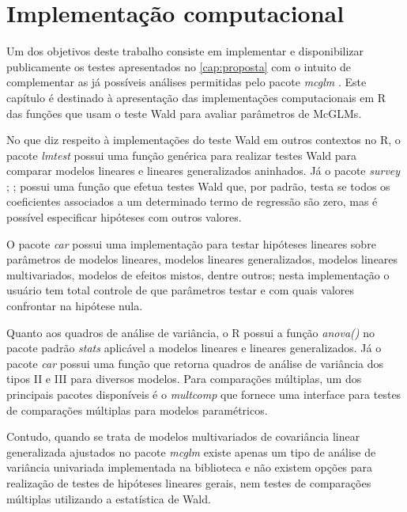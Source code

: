 
\chapter{Implementação computacional}\label{cap:implementacao}


Um dos objetivos deste trabalho consiste em implementar e disponibilizar publicamente os testes apresentados no \autoref{cap:proposta} com o intuito de complementar as já possíveis análises permitidas pelo pacote \emph{mcglm} \citep{mcglm}. Este capítulo é destinado à apresentação das implementações computacionais em R das funções que usam o teste Wald para avaliar parâmetros de McGLMs.

No que diz respeito à implementações do teste Wald em outros contextos no R, o pacote \emph{lmtest} \citep{lmtest} possui uma função genérica para realizar testes Wald para comparar modelos lineares e lineares generalizados aninhados. Já o pacote \emph{survey} \citep{survey1}; \citep{survey2};\citep{survey3} possui uma função que efetua testes Wald que, por padrão, testa se todos os coeficientes associados a um determinado termo de regressão são zero, mas é possível especificar hipóteses com outros valores. 

O pacote \emph{car} \citep{car} possui uma implementação para testar hipóteses lineares sobre parâmetros de modelos lineares, modelos lineares generalizados, modelos lineares multivariados, modelos de efeitos mistos, dentre outros; nesta implementação o usuário tem total controle de que parâmetros testar e com quais valores confrontar na hipótese nula. 

Quanto aos quadros de análise de variância, o R possui a função \emph{anova()} no pacote padrão \emph{stats} \citep{softwareR} aplicável a modelos lineares e lineares generalizados. Já o pacote \emph{car} \citep{car} possui uma função que retorna quadros de análise de variância dos tipos II e III para diversos modelos. Para comparações múltiplas, um dos principais pacotes disponíveis é o \emph{multcomp} \citep{multcomp} que fornece uma interface para testes de comparações múltiplas para modelos paramétricos.

Contudo, quando se trata de modelos multivariados de covariância linear generalizada ajustados no pacote \emph{mcglm} existe apenas um tipo de análise de variância univariada implementada na biblioteca e não existem opções para realização de testes de hipóteses lineares gerais, nem testes de comparações múltiplas utilizando a estatística de Wald. 

